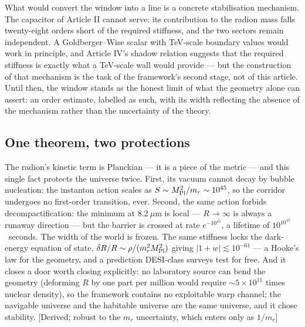 What would convert the window into a line is a concrete stabilisation mechanism. The capacitor of Article II cannot serve: its contribution to the radion mass falls twenty-eight orders short of the required stiffness, and the two sectors remain independent. A Goldberger--Wise scalar with TeV-scale boundary values would work in principle, and Article IV's shadow relation suggests that the required stiffness is exactly what a TeV-scale wall would provide --- but the construction of that mechanism is the task of the framework's second stage, not of this article. Until then, the window stands as the honest limit of what the geometry alone can assert: an order estimate, labelled as such, with its width reflecting the absence of the mechanism rather than the uncertainty of the theory.

\subsection{One theorem, two protections}
The radion's kinetic term is Planckian --- it is a piece of the metric --- and this single fact protects the universe twice. First, its vacuum cannot decay by bubble nucleation: the instanton action scales as $S\sim M_{\rm Pl}^{2}/m_{r}\sim10^{45}$, so the corridor undergoes no first-order transition, ever. Second, the same action forbids decompactification: the minimum at $8.2~\mu$m is local --- $R\to\infty$ is always a runaway direction --- but the barrier is crossed at rate $e^{-10^{45}}$, a lifetime of $10^{10^{45}}$~seconds. The width of the world is frozen. The same stiffness locks the dark-energy equation of state, $\delta R/R\sim\rho/(m_{r}^{2}M_{\rm Pl}^{2})$ giving $|1+w|\lesssim10^{-61}$ --- a Hooke's law for the geometry, and a prediction DESI-class surveys test for free. And it closes a door worth closing explicitly: no laboratory source can bend the geometry (deforming $R$ by one part per million would require $\sim5\times10^{11}$ times nuclear density), so the framework contains no exploitable warp channel; the navigable universe and the habitable universe are the same universe, and it chose stability. [Derived; robust to the $m_{r}$ uncertainty, which enters only as $1/m_{r}$]


